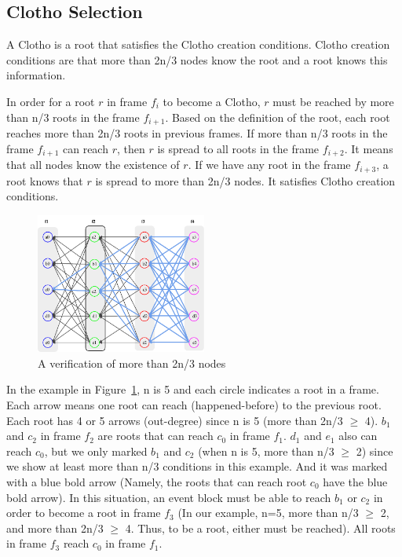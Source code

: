 \documentclass{article}
\begin{document}
\subsection{Clotho Selection}

A Clotho is a root that satisfies the Clotho creation conditions. 
Clotho creation conditions are that more than 2n/3 nodes know the root and a root knows this information.

In order for a root $r$ in frame $f_i$ to become a Clotho, $r$ must be reached by more than n/3 roots in the frame $f_{i+1}$. Based on the definition of the root, each root reaches more than 2n/3 roots in previous frames. If more than n/3 roots in the frame $f_{i+1}$ can reach $r$, then $r$ is spread to all roots in the frame $f_{i+2}$. It means that all nodes know the existence of $r$. If we have any root in the frame $f_{i+3}$, a root knows that $r$ is spread to more than 2n/3 nodes. It satisfies Clotho creation conditions. 

\begin{figure} [H] \centering  
	\includegraphics[width=0.5\textwidth]{frame4.pdf}
	\caption{A verification of more than 2n/3 nodes}
	\label{fig:frame4}
\end{figure}

In the example in Figure~\ref{fig:frame4}, n is 5 and each circle indicates a root in a frame. Each arrow means one root can reach (happened-before) to the previous root. Each root has 4 or 5 arrows (out-degree) since n is 5 (more than 2n/3 $\geq$ 4). $b_1$ and $c_2$ in frame $f_2$ are roots that can reach $c_0$ in frame $f_1$. $d_1$ and $e_1$ also can reach $c_0$, but we only marked $b_1$ and $c_2$ (when n is 5, more than n/3 $\geq$ 2) since we show at least more than n/3 conditions in this example. And it was marked with a blue bold arrow (Namely, the roots that can reach root $c_0$ have the blue bold arrow). In this situation, an event block must be able to reach $b_1$ or $c_2$ in order to become a root in frame $f_3$ (In our example, n=5, more than n/3 $\geq$ 2, and more than 2n/3 $\geq$ 4. Thus, to be a root, either must be reached). All roots in frame $f_3$ reach $c_0$ in frame $f_1$.  
\end{document}
